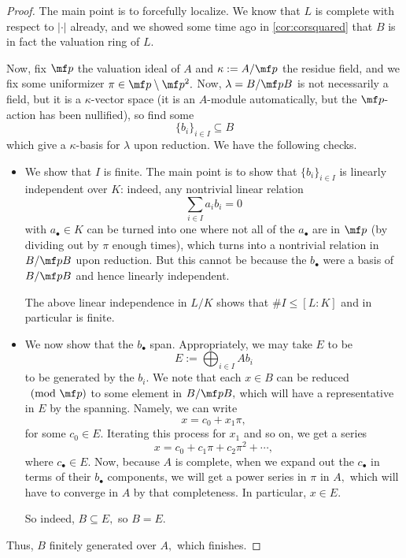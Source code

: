 \begin{proof}
	The main point is to forcefully localize. We know that $L$ is complete with respect to $|\cdot|$ already, and we showed some time ago in \autoref{cor:corsquared} that $B$ is in fact the valuation ring of $L.$

	Now, fix $\mf p$ the valuation ideal of $A$ and $\kappa:=A/\mf p$ the residue field, and we fix some uniformizer $\pi\in\mf p\setminus\mf p^2.$ Now, $\lambda=B/\mf pB$ is not necessarily a field, but it is a $\kappa$-vector space (it is an $A$-module automatically, but the $\mf p$-action has been nullified), so find some
	\[\{b_i\}_{i\in I}\subseteq B\]
	which give a $\kappa$-basis for $\lambda$ upon reduction. We have the following checks.
	\begin{itemize}
		\item We show that $I$ is finite. The main point is to show that $\{b_i\}_{i\in I}$ is linearly independent over $K$: indeed, any nontrivial linear relation
		\[\sum_{i\in I}a_ib_i=0\]
		with $a_\bullet\in K$ can be turned into one where not all of the $a_\bullet$ are in $\mf p$ (by dividing out by $\pi$ enough times), which turns into a nontrivial relation in $B/\mf pB$ upon reduction. But this cannot be because the $b_\bullet$ were a basis of $B/\mf pB$ and hence linearly independent.
		
		The above linear independence in $L/K$ shows that $\#I\le[L:K]$ and in particular is finite.

		\item We now show that the $b_\bullet$ span. Appropriately, we may take $E$ to be
		\[E:=\bigoplus_{i\in I}Ab_i\]
		to be generated by the $b_i.$ We note that each $x\in B$ can be reduced$\pmod{\mf p}$ to some element in $B/\mf pB,$ which will have a representative in $E$ by the spanning. Namely, we can write
		\[x=c_0+x_1\pi,\]
		for some $c_0\in E.$ Iterating this process for $x_1$ and so on, we get a series
		\[x=c_0+c_1\pi+c_2\pi^2+\cdots,\]
		where $c_\bullet\in E.$ Now, because $A$ is complete, when we expand out the $c_\bullet$ in terms of their $b_\bullet$ components, we will get a power series in $\pi$ in $A,$ which will have to converge in $A$ by that completeness. In particular, $x\in E.$

		So indeed, $B\subseteq E,$ so $B=E.$
	\end{itemize}
	Thus, $B$ finitely generated over $A,$ which finishes.
\end{proof}

